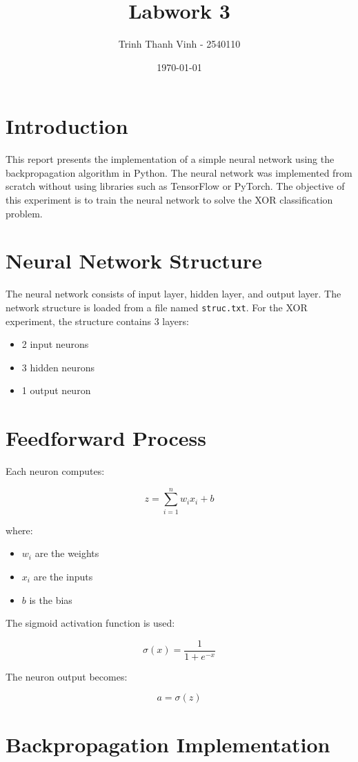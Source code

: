 \documentclass[12pt]{article}
\title{Labwork 3}
\author{Trinh Thanh Vinh - 2540110}
\date{\today}
\begin{document}
\maketitle
\section{Introduction}

This report presents the implementation of a simple neural network using the backpropagation algorithm in Python. The neural network was implemented from scratch without using libraries such as TensorFlow or PyTorch. The objective of this experiment is to train the neural network to solve the XOR classification problem.

\section{Neural Network Structure}

The neural network consists of input layer, hidden layer, and output layer. The network structure is loaded from a file named \texttt{struc.txt}. For the XOR experiment, the structure contains 3 layers:
\begin{itemize}
    \item 2 input neurons
    \item 3 hidden neurons
    \item 1 output neuron
\end{itemize}

\section{Feedforward Process}

Each neuron computes:

\[
z = \sum_{i=1}^{n} w_i x_i + b
\]

where:
\begin{itemize}
    \item $w_i$ are the weights
    \item $x_i$ are the inputs
    \item $b$ is the bias
\end{itemize}

The sigmoid activation function is used:

\[
\sigma(x) = \frac{1}{1 + e^{-x}}
\]

The neuron output becomes:

\[
a = \sigma(z)
\]

\section{Backpropagation Implementation}
\end{document}
